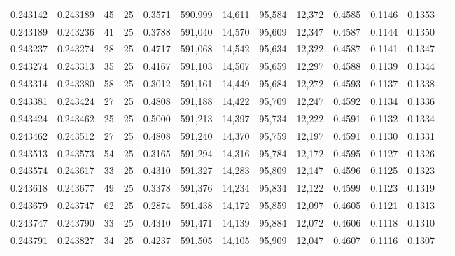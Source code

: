 \begin{tabular}{rrrrrrrrrrrrr}
0.243142 & 0.243189 &    45 &  25 &                                     0.3571 & 590,999 &  14,611 &  95,584 &  12,372 & 0.4585 & 0.1146 & 0.1353 \\
0.243189 & 0.243236 &    41 &  25 &                                     0.3788 & 591,040 &  14,570 &  95,609 &  12,347 & 0.4587 & 0.1144 & 0.1350 \\
0.243237 & 0.243274 &    28 &  25 &                                     0.4717 & 591,068 &  14,542 &  95,634 &  12,322 & 0.4587 & 0.1141 & 0.1347 \\
0.243274 & 0.243313 &    35 &  25 &                                     0.4167 & 591,103 &  14,507 &  95,659 &  12,297 & 0.4588 & 0.1139 & 0.1344 \\
0.243314 & 0.243380 &    58 &  25 &                                     0.3012 & 591,161 &  14,449 &  95,684 &  12,272 & 0.4593 & 0.1137 & 0.1338 \\
0.243381 & 0.243424 &    27 &  25 &                                     0.4808 & 591,188 &  14,422 &  95,709 &  12,247 & 0.4592 & 0.1134 & 0.1336 \\
0.243424 & 0.243462 &    25 &  25 &                                     0.5000 & 591,213 &  14,397 &  95,734 &  12,222 & 0.4591 & 0.1132 & 0.1334 \\
0.243462 & 0.243512 &    27 &  25 &                                     0.4808 & 591,240 &  14,370 &  95,759 &  12,197 & 0.4591 & 0.1130 & 0.1331 \\
0.243513 & 0.243573 &    54 &  25 &                                     0.3165 & 591,294 &  14,316 &  95,784 &  12,172 & 0.4595 & 0.1127 & 0.1326 \\
0.243574 & 0.243617 &    33 &  25 &                                     0.4310 & 591,327 &  14,283 &  95,809 &  12,147 & 0.4596 & 0.1125 & 0.1323 \\
0.243618 & 0.243677 &    49 &  25 &                                     0.3378 & 591,376 &  14,234 &  95,834 &  12,122 & 0.4599 & 0.1123 & 0.1319 \\
0.243679 & 0.243747 &    62 &  25 &                                     0.2874 & 591,438 &  14,172 &  95,859 &  12,097 & 0.4605 & 0.1121 & 0.1313 \\
0.243747 & 0.243790 &    33 &  25 &                                     0.4310 & 591,471 &  14,139 &  95,884 &  12,072 & 0.4606 & 0.1118 & 0.1310 \\
0.243791 & 0.243827 &    34 &  25 &                                     0.4237 & 591,505 &  14,105 &  95,909 &  12,047 & 0.4607 & 0.1116 & 0.1307 \\

\end{tabular}

